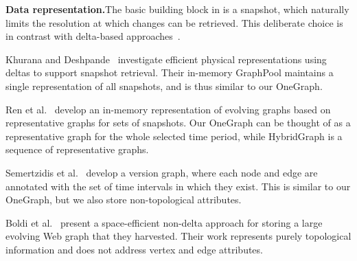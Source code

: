 {\bf Data representation.}The basic building block in \ql is a snapshot,
which naturally limits the resolution at which changes can be
retrieved. This deliberate choice is in contrast with delta-based
approaches~\cite{Khurana2013,Koloniari2012,DBLP:journals/tos/MiaoHLWYZPCC15}.

Khurana and Deshpande~\cite{Khurana2013} investigate efficient
physical representations using deltas to support snapshot retrieval.
Their in-memory GraphPool maintains a single representation of all
snapshots, and is thus similar to our OneGraph.

Ren et al.~\cite{Ren2011} develop an in-memory representation of
evolving graphs based on representative graphs for sets of snapshots.
  Our OneGraph can
be thought of as a representative graph for the whole selected time
period, while HybridGraph is a sequence of representative graphs.

Semertzidis et al.~\cite{Semertzidis2015} develop a version graph,
where each node and edge are annotated with the set of time intervals
in which they exist.  This is similar to our OneGraph, but we also
store non-topological attributes.

Boldi et al.~\cite{Boldi2008} present a space-efficient non-delta
approach for storing a large evolving Web graph that they harvested.
Their
work represents purely topological information and does not address
vertex and edge attributes.

